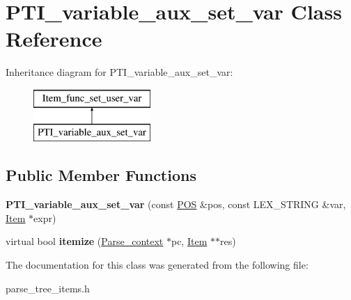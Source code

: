 \hypertarget{classPTI__variable__aux__set__var}{}\section{P\+T\+I\+\_\+variable\+\_\+aux\+\_\+set\+\_\+var Class Reference}
\label{classPTI__variable__aux__set__var}
Inheritance diagram for P\+T\+I\+\_\+variable\+\_\+aux\+\_\+set\+\_\+var\+:\begin{figure}[H]
\begin{center}
\leavevmode
\includegraphics[height=2.000000cm]{classPTI__variable__aux__set__var}
\end{center}
\end{figure}
\subsection*{Public Member Functions}
\begin{DoxyCompactItemize}
\item 
\mbox{\label{classPTI__variable__aux__set__var_a24ce8a2aa12e5e821c66dfc83d1f35ed}} 
{\bfseries P\+T\+I\+\_\+variable\+\_\+aux\+\_\+set\+\_\+var} (const \mbox{\hyperlink{structYYLTYPE}{P\+OS}} \&pos, const L\+E\+X\+\_\+\+S\+T\+R\+I\+NG \&var, \mbox{\hyperlink{classItem}{Item}} $\ast$expr)
\item 
\mbox{\label{classPTI__variable__aux__set__var_aba80c785f035181dbd0c9491337b05ae}} 
virtual bool {\bfseries itemize} (\mbox{\hyperlink{structParse__context}{Parse\+\_\+context}} $\ast$pc, \mbox{\hyperlink{classItem}{Item}} $\ast$$\ast$res)
\end{DoxyCompactItemize}


The documentation for this class was generated from the following file\+:\begin{DoxyCompactItemize}
\item 
parse\+\_\+tree\+\_\+items.\+h\end{DoxyCompactItemize}
